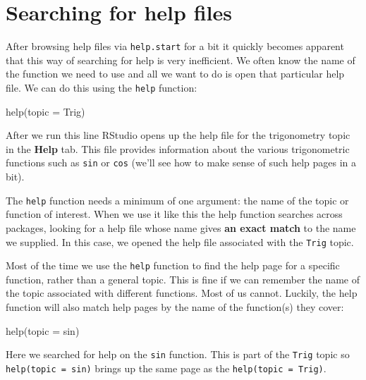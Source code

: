 \documentclass[
]{book}
\newenvironment{Shaded}{\begin{snugshade}}{\end{snugshade}}
\newcommand{\AttributeTok}[1]{\textcolor[rgb]{0.77,0.63,0.00}{#1}}
\newcommand{\FunctionTok}[1]{\textcolor[rgb]{0.00,0.00,0.00}{#1}}
\newcommand{\NormalTok}[1]{#1}
\begin{document}
\hypertarget{searching-for-help-files}{%
\section{Searching for help files}\label{searching-for-help-files}}

After browsing help files via \texttt{help.start} for a bit it quickly becomes apparent that this way of searching for help is very inefficient. We often know the name of the function we need to use and all we want to do is open that particular help file. We can do this using the \texttt{help} function:

\begin{Shaded}
\begin{Highlighting}[]
\FunctionTok{help}\NormalTok{(}\AttributeTok{topic =}\NormalTok{ Trig)}
\end{Highlighting}
\end{Shaded}

After we run this line RStudio opens up the help file for the trigonometry topic in the \textbf{Help} tab. This file provides information about the various trigonometric functions such as \texttt{sin} or \texttt{cos} (we'll see how to make sense of such help pages in a bit).

The \texttt{help} function needs a minimum of one argument: the name of the topic or function of interest. When we use it like this the help function searches across packages, looking for a help file whose name gives \textbf{an exact match} to the name we supplied. In this case, we opened the help file associated with the \texttt{Trig} topic.

Most of the time we use the \texttt{help} function to find the help page for a specific function, rather than a general topic. This is fine if we can remember the name of the topic associated with different functions. Most of us cannot. Luckily, the help function will also match help pages by the name of the function(s) they cover:

\begin{Shaded}
\begin{Highlighting}[]
\FunctionTok{help}\NormalTok{(}\AttributeTok{topic =}\NormalTok{ sin)}
\end{Highlighting}
\end{Shaded}

Here we searched for help on the \texttt{sin} function. This is part of the \texttt{Trig} topic so \texttt{help(topic\ =\ sin)} brings up the same page as the \texttt{help(topic\ =\ Trig)}.
\end{document}
